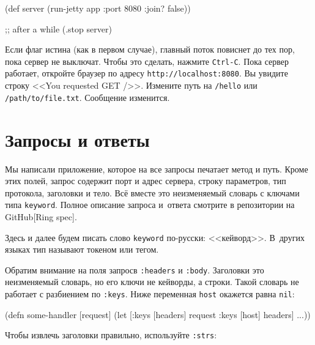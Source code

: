 \begin{english}
  \begin{clojure}
(def server
  (run-jetty app {:port 8080 :join? false}))

;; after a while
(.stop server)
  \end{clojure}
\end{english}

Если флаг истина (как в первом случае), главный поток повиснет до тех пор, пока
сервер не выключат. Чтобы это сделать, нажмите \verb|Ctrl-C|. Пока сервер
работает, откройте браузер по адресу \verb|http://localhost:8080|. Вы увидите
строку <<You requested GET />>. Измените путь на \verb|/hello| или
\verb|/path/to/file.txt|. Сообщение изменится.

\section{Запросы и ответы}

Мы написали приложение, которое на все запросы печатает метод и путь. Кроме этих
полей, запрос содержит порт и адрес сервера, строку параметров, тип протокола,
заголовки и тело. Всё вместе это неизменяемый словарь с ключами типа
\verb|keyword|. Полное описание запроса и~ответа смотрите в репозитории на
GitHub[Ring spec].


Здесь и далее будем писать слово \verb|keyword| по-русски:
<<кейворд>>. В~других языках тип называют токеном или тегом.


Обратим внимание на поля запросв \verb|:headers| и \verb|:body|. Заголовки
это неизменяемый словарь, но его ключи не кейворды, а строки. Такой словарь не
работает с разбиением по \verb|:keys|. Ниже переменная \verb|host| окажется
равна \verb|nil|:


\begin{english}
  \begin{clojure}
(defn some-handler
  [request]
  (let [{:keys [headers]} request
        {:keys [host]} headers]
    ...))
  \end{clojure}
\end{english}


\noindent
Чтобы извлечь заголовки правильно, используйте \verb|:strs|:

